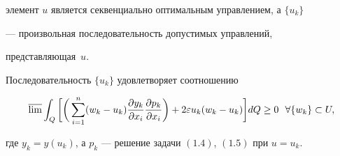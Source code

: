 элемент $u$ является секвенциально оптимальным управлением, а $\{u_k\}$ 


--- произвольная последовательность допустимых управлений,


представляющая~$u$. 


 


\begin{thm} 


Последовательность $\{u_k\}$ удовлетворяет соотношению 


\begin{equation} 


\varlimsup\int_Q\bigg[\bigg(\sum^n_{i=1}(w_k-u_k) 


\frac{\partial y_k}{\partial x_i} 


\frac{\partial p_k}{\partial x_i}\bigg) 


+2\varepsilon u_k(w_k-u_k)\bigg]d Q\ge0\ \ \forall\{w_k\}\subset U, 


\end{equation} 


где $y_k=y(u_k)$, а $p_k$ --- решение задачи $(1.4)$, $(1.5)$ при $u=u_k$. 


\end{thm} 


 


